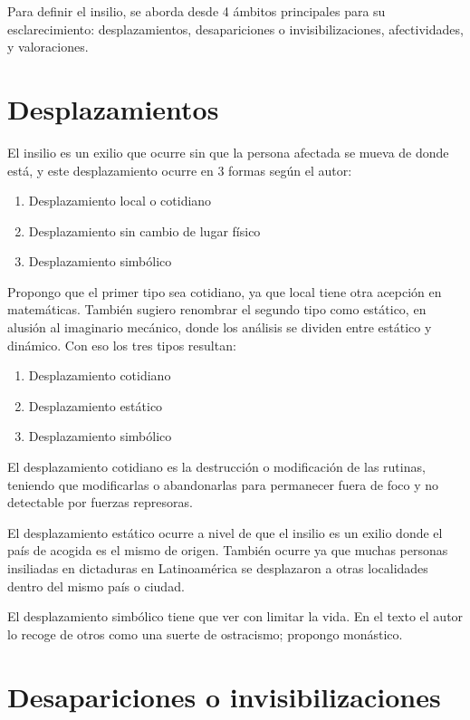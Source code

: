 \documentclass[./informes.tex]{subfiles}
\begin{document}
Para definir el insilio, se aborda desde 4 ámbitos principales para su esclarecimiento: desplazamientos, desapariciones o invisibilizaciones, afectividades, y valoraciones.

\section{Desplazamientos}

El insilio es un exilio que ocurre sin que la persona afectada se mueva de donde está, y este desplazamiento ocurre en 3 formas según el autor:

\begin{enumerate}
  \item Desplazamiento local o cotidiano
  \item Desplazamiento sin cambio de lugar físico
  \item Desplazamiento simbólico
\end{enumerate}

Propongo que el primer tipo sea cotidiano, ya que local tiene otra acepción en matemáticas. También sugiero renombrar el segundo tipo como estático, en alusión al imaginario mecánico, donde los análisis se dividen entre estático y dinámico. Con eso los tres tipos resultan:

\begin{enumerate}
  \item Desplazamiento cotidiano
  \item Desplazamiento estático
  \item Desplazamiento simbólico
\end{enumerate}

El desplazamiento cotidiano es la destrucción o modificación de las rutinas, teniendo que modificarlas o abandonarlas para permanecer fuera de foco y no detectable por fuerzas represoras.

El desplazamiento estático ocurre a nivel de que el insilio es un exilio donde el país de acogida es el mismo de origen. También ocurre ya que muchas personas insiliadas en dictaduras en Latinoamérica se desplazaron a otras localidades dentro del mismo país o ciudad.

El desplazamiento simbólico tiene que ver con limitar la vida. En el texto el autor lo recoge de otros como una suerte de ostracismo; propongo monástico.

\section{Desapariciones o invisibilizaciones}
\end{document}
